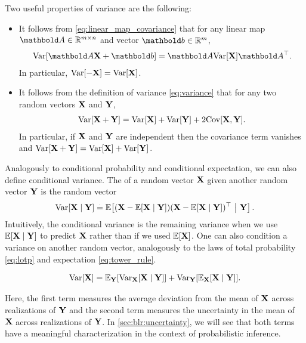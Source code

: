 Two useful properties of variance are the following: \begin{itemize}
  \item It follows from \cref{eq:linear_map_covariance} that for any linear map $\mA \in \R^{m \times n}$ and vector $\vb \in \R^m$, \begin{align}
    \Var{\mA\rX + \vb} = \mA\Var{\rX}\transpose{\mA}. \label{eq:linear_map_variance}
  \end{align}
  In particular, $\Var{-\rX} = \Var{\rX}$.

  \item It follows from the definition of variance \eqref{eq:variance} that for any two random vectors $\mathbf{X}$ and $\mathbf{Y}$, \begin{align}
    \Var{\rX + \rY} = \Var{\rX} + \Var{\rY} + 2 \Cov{\rX, \rY}. \label{eq:sum_variance}
  \end{align}
  In particular, if $\mathbf{X}$ and $\mathbf{Y}$ are independent then the covariance term vanishes and $\Var{\rX + \rY} = \Var{\rX} + \Var{\rY}$.
\end{itemize}

Analogously to conditional probability and conditional expectation, we can also define conditional variance. The  of a random vector $\mathbf{X}$ given another random vector $\mathbf{Y}$ is the random vector \begin{align}
  \Var{\rX \mid \rY} \defeq \E{(\rX - \E{\rX \mid \rY}) \transpose{(\rX - \E{\rX \mid \rY})}}[\rY].
\end{align}
Intuitively, the conditional variance is the remaining variance when we use $\E{\rX \mid \rY}$ to predict $\mathbf{X}$ rather than if we used $\E{\rX}$.
One can also condition a variance on another random vector, analogously to the laws of total probability \eqref{eq:lotp} and expectation \eqref{eq:tower_rule}.

\begin{thmb}
  \begin{thm}\label{thm:lotv}
    \begin{align}
      \Var{\rX} = \E[\rY]{\Var[\rX]{\rX \mid \rY}} + \Var[\rY]{\E[\rX]{\rX \mid \rY}}. \label{eq:lotv}
    \end{align}
  \end{thm}
\end{thmb}

Here, the first term measures the average deviation from the mean of $\mathbf{X}$ across realizations of $\mathbf{Y}$ and the second term measures the uncertainty in the mean of $\mathbf{X}$ across realizations of $\mathbf{Y}$.
In \cref{sec:blr:uncertainty}, we will see that both terms have a meaningful characterization in the context of probabilistic inference.


